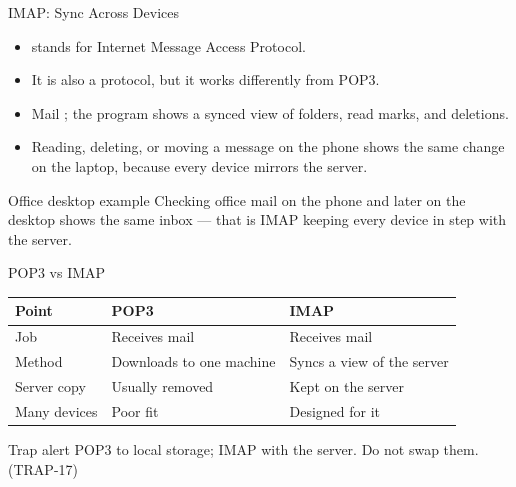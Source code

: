 \documentclass[aspectratio=169]{beamer}
\begin{document}
\begin{frame}{IMAP: Sync Across Devices}
  \begin{itemize}
    \item {} stands for Internet Message Access Protocol.
    \item It is also a  protocol, but it works
      differently from POP3.
    \item Mail ; the program shows a synced
      view of folders, read marks, and deletions.
    \item Reading, deleting, or moving a message on the phone shows the
      same change on the laptop, because every device mirrors the
      server.
  \end{itemize}
  \begin{block}{Office desktop example}
    Checking office mail on the phone and later on the desktop shows the
    same inbox --- that is IMAP keeping every device in step with the
    server.
  \end{block}
\end{frame}

\begin{frame}{POP3 vs IMAP}
  \begin{center}
    \begin{tabular}{lll}
      \toprule
      \textbf{Point} & \textbf{POP3} & \textbf{IMAP} \\
      \midrule
      Job & Receives mail & Receives mail \\
      Method & Downloads to one machine & Syncs a view of the server \\
      Server copy & Usually removed & Kept on the server \\
      Many devices & Poor fit & Designed for it \\
      \bottomrule
    \end{tabular}
  \end{center}
  \vspace{0.35cm}
  \begin{alertblock}{Trap alert}
    POP3  to local storage; IMAP  with the
    server. Do not swap them. (TRAP-17)
  \end{alertblock}
\end{frame}
\end{document}
